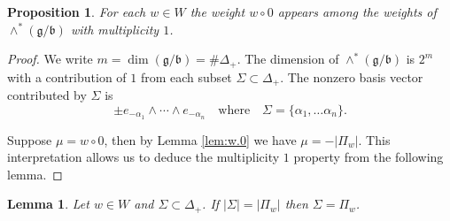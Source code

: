 \documentclass[12pt]{article}
\theoremstyle{plain}
\newtheorem{lemma}[thm]{Lemma}
\newtheorem{prop}[thm]{Proposition}
\theoremstyle{definition}
\numberwithin{equation}{section}
\newcommand{\al}{\alpha}
\newcommand{\D}{\Delta}
\newcommand{\g}{\mathfrak{g}}
\newcommand{\fb}{\mathfrak{b}}
\begin{document}
\begin{prop}
For each $w \in W$ the weight $w \circ 0$ appears among the weights of $\wedge^*(\g/\fb)$ with multiplicity $1$.
\end{prop}

\begin{proof}
We write $m = \dim(\g/\fb) = \# \D_+$. The dimension of $\wedge^*(\g/\fb)$ is $2^m$ with a contribution of $1$ from each subset $\Sigma \subset \D_+$. The nonzero basis vector contributed by $\Sigma$ is
\[
 \pm e_{-\al_1} \wedge \cdots \wedge e_{-\al_n} \quad \text{where} \quad \Sigma = \{\al_1, \ldots \al_n\}.
\]

Suppose $\mu = w \circ 0$, then by Lemma \ref{lem:w.0} we have $\mu = -|\Pi_w|$. This interpretation allows us to deduce the multiplicity $1$ property from the following lemma.
\end{proof}

\begin{lemma}
Let $w \in W$ and $\Sigma \subset \D_+$. If $|\Sigma| = |\Pi_w|$ then $\Sigma = \Pi_w$.
\end{lemma}
\end{document}
